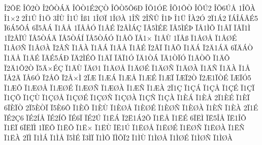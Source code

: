 {^^ce2^^d4^^cb
^^ce^^d42^^d2
^^ce2^^d4^^d2^^c1^^c4
^^ce^^d4^^d21^^c92^^c7^^d2
^^ce^^d4^^d25^^d56^^d0
^^ce^^d51^^d3^^cb
^^ce^^d51^^d4^^d2
^^ce^^d5^^da2
^^ce^^d56^^da^^c5
1^^ce^^d5^^c0
^^ce1^^d72
2^^ce1^^db
^^ce1^^d6
3^^ce^^d9
^^ce1^^da
^^ce^^df1
1^^ce^^d8^^cf
1^^ce^^d8^^c0
1^^ce^^d1
2^^ce^^d1^^db
^^ce1^^de
^^ce1^^dc
^^ce^^c02^^d3
2^^cf1^^c12
^^cf^^c1^^ce^^c1^^c2^^c95
^^cf6^^c15^^d4^^c1
6^^cf5^^c2^^c1
^^cf1^^c2^^c5
1^^cf^^c2^^c5^^d3
^^cf1^^c2^^c9
^^cf2^^c2^^cc^^c1^^c7
^^cf^^c25^^cc^^c9^^cb
^^cf^^c25^^cc^^c9^^de
^^cf^^c21^^cc^^d5
^^cf1^^c2^^cf
^^cf^^c2^^cf1^^cc
1^^cf2^^c2^^cf^^da
^^cf^^c25^^d2^^c1^^c4
^^cf^^c25^^d2^^c1^^cd
^^cf^^c25^^d2^^c1^^d3
^^cf1^^c2^^d5
^^cf^^c21^^d7
^^cf1^^c2^^d9
1^^cf^^c2^^df
^^cf1^^c2^^d8^^c5
^^cf1^^c2^^d8^^c9
^^cf1^^c2^^d8^^d1
^^cf1^^c2^^d8^^c0
^^cf2^^c2^^d1
^^cf1^^c2^^c0
^^cf1^^c3^^c1
^^cf1^^c3^^c5
^^cf1^^c3^^c9
^^cf2^^c3^^cf
^^cf1^^c3^^d5
^^cf1^^c4^^c1
^^cf2^^c41^^c1^^c4
6^^cf^^c4^^c1^^d2
^^cf1^^c4^^c5
^^cf1^^c4^^c9
^^cf^^c4^^c95^^c1^^d0
^^cf^^c42^^cc^^c9^^d4
^^cf1^^c4^^cf
^^cf^^c4^^cf1^^d3
^^cf^^c41^^d2^^c1
^^cf^^c41^^d2^^cf^^d3
^^cf1^^c4^^d2^^d5
^^cf1^^c4^^d5
^^cf2^^c41^^d52^^d2
^^cf5^^c4^^d7^^c9^^c7
^^cf1^^c4^^d9
^^cf^^c4^^d81
^^cf1^^c4^^d8^^c5
^^cf1^^c4^^d8^^c9
^^cf1^^c4^^d8^^d1
^^cf1^^c4^^d8^^c0
^^cf1^^c4^^d1
^^cf1^^c4^^c0
^^cf1^^c5
^^cf^^c52^^c4
^^cf^^c56^^d3
^^cf2^^c5^^d4
^^cf2^^c5^^d7^^cc
2^^cf^^c6
^^cf1^^c6^^c1
^^cf1^^c6^^c5
^^cf1^^c6^^c9
^^cf1^^c6^^cf
^^cf^^c6^^cf2^^d2
^^cf2^^c61^^cf^^d2^^c9
^^cf^^c6^^cf^^d35
^^cf1^^c6^^d5
^^cf1^^c6^^d8^^c5
^^cf1^^c6^^d8^^c9
^^cf1^^c6^^d8^^d1
^^cf1^^c6^^d8^^c0
^^cf1^^c6^^d1
^^cf1^^c6^^c0
2^^cf1^^c7
^^cf1^^c7^^c1
^^cf1^^c7^^c5
^^cf1^^c7^^c9
^^cf1^^c7^^cf
^^cf1^^c7^^d5
^^cf1^^c7^^d9
^^cf1^^c7^^d8^^c5
^^cf1^^c7^^d8^^c9
^^cf1^^c7^^d8^^d1
^^cf1^^c7^^d8^^c0
^^cf1^^c7^^d1
^^cf1^^c7^^c0
^^cf1^^c8^^c1
^^cf1^^c8^^c5
2^^cf1^^c8^^c9
^^cf1^^c8^^cf
6^^cf^^c8^^cf^^d2
2^^cf5^^c8^^d2^^cf
^^cf5^^c86^^d4
^^cf1^^c8^^d5
^^cf1^^c8^^d9
^^cf1^^c8^^d8^^c5
^^cf1^^c8^^d8^^c9
^^cf1^^c8^^d8^^d1
^^cf1^^c8^^d8^^c0
^^cf1^^c8^^d1
^^cf1^^c8^^c0
2^^cf1^^c9
^^cf^^c92^^c76
^^cf^^c92^^cd^^c5
^^cf^^c92^^cd^^d5
^^cf^^c96^^cf
^^cf^^c92^^da
^^cf1^^cb^^c1
^^cf2^^cb1^^c12^^d5
^^cf1^^cb^^c5
^^cf1^^cb^^c9
6^^cf^^cb^^cc
^^cf^^cb5^^ce^^c5
^^cf^^cb1^^ce^^d5
^^cf1^^cb^^cf
6^^cf^^cb^^cf^^cc
1^^cf^^cb^^d4
^^cf1^^cb^^d5
^^cf1^^cb^^d7
^^cf1^^cb^^d9
^^cf^^cb1^^da
^^cf1^^cb^^d8^^c5
^^cf1^^cb^^d8^^c9
^^cf1^^cb^^d8^^d1
^^cf1^^cb^^d8^^c0
^^cf1^^cb^^d1
^^cf1^^cb^^c0
2^^cf^^cc
^^cf1^^cc^^c1
^^cf1^^cc^^c5
^^cf5^^cc^^c9
^^cf3^^cc^^cf
^^cf1^^cc^^d5
^^cf^^cc^^d5^^cf2
^^cf1^^cc^^d9
^^cf1^^cc^^d8^^c5
^^cf1^^cc^^d8^^c9
^^cf1^^cc^^d8^^d1
^^cf1^^cc^^d8^^c0
}
